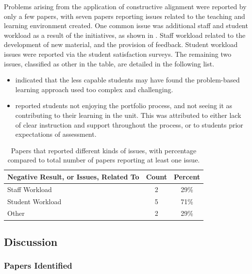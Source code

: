 Problems arising from the application of constructive alignment were reported by only a few papers, with seven papers reporting issues related to the teaching and learning environment created. One common issue was additional staff and student workload as a result of the initiatives, as shown in . Staff workload related to the development of new material, and the provision of feedback. Student workload issues were reported via the student satisfaction surveys. The remaining two issues, classified as other in the table, are detailed in the following list.

\begin{itemize}[noitemsep,nolistsep]
	\item \citet{Lin:2004} indicated that the less capable students may have found the problem-based learning approach used too complex and challenging.
	\item \citet{Tang:1999} reported students not enjoying the portfolio process, and not seeing it as contributing to their learning in the unit. This was attributed to either lack of clear instruction and support throughout the process, or to students prior expectations of assessment.
\end{itemize}

\begin{table}[htbp]
	\centering
	\caption{Papers that reported different kinds of issues, with percentage compared to total number of papers reporting at least one issue.}
	\label{tbl:neg_results}
	\footnotesize
    \begin{tabular}{l|c|c}
     \textbf{Negative Result, or Issues, Related To} & \textbf{Count} & \textbf{Percent} \\ \hline
	Staff Workload	& 2	& 29\% \\
	Student Workload	& 5	& 71\% \\
	Other	& 2	& 29\% \\
    \end{tabular}
\end{table}



\clearpage
\subsection{Discussion} %
\label{sub:discussion}


\subsubsection{Papers Identified} %
\label{ssub:geographic_location}

